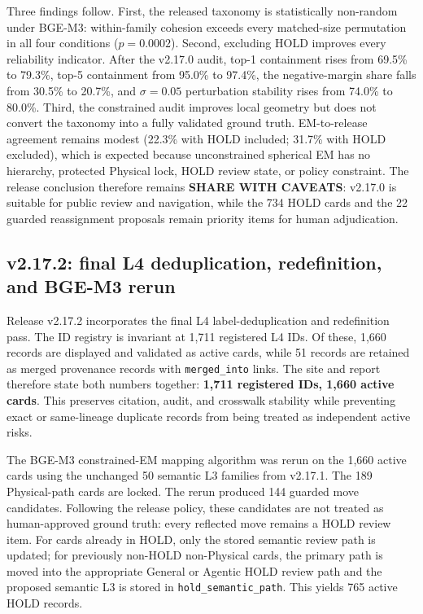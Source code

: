 \documentclass[11pt,a4paper]{article}
\newcommand{\code}[1]{\texttt{#1}}
\begin{document}
Three findings follow. First, the released taxonomy is statistically
non-random under BGE-M3: within-family cohesion exceeds every matched-size
permutation in all four conditions ($p=0.0002$). Second, excluding HOLD
improves every reliability indicator. After the v2.17.0 audit, top-1
containment rises from 69.5\% to 79.3\%, top-5 containment from 95.0\% to
97.4\%, the negative-margin share falls from 30.5\% to 20.7\%, and
$\sigma=0.05$ perturbation stability rises from 74.0\% to 80.0\%. Third, the
constrained audit improves local geometry but does not convert the taxonomy
into a fully validated ground truth. EM-to-release agreement remains modest
(22.3\% with HOLD included; 31.7\% with HOLD excluded), which is expected
because unconstrained spherical EM has no hierarchy, protected Physical lock,
HOLD review state, or policy constraint. The release conclusion therefore
remains \textbf{SHARE WITH CAVEATS}: v2.17.0 is suitable for public review and
navigation, while the 734 HOLD cards and the 22 guarded reassignment proposals
remain priority items for human adjudication.

\subsection{v2.17.2: final L4 deduplication, redefinition, and BGE-M3 rerun}

Release v2.17.2 incorporates the final L4 label-deduplication and
redefinition pass. The ID registry is invariant at 1,711 registered L4 IDs.
Of these, 1,660 records are displayed and validated as active cards, while 51
records are retained as merged provenance records with \code{merged\_into}
links. The site and report therefore state both numbers together:
\textbf{1,711 registered IDs, 1,660 active cards}. This preserves citation,
audit, and crosswalk stability while preventing exact or same-lineage duplicate
records from being treated as independent active risks.

The BGE-M3 constrained-EM mapping algorithm was rerun on the 1,660 active
cards using the unchanged 50 semantic L3 families from v2.17.1. The 189
Physical-path cards are locked. The rerun produced 144 guarded move
candidates. Following the release policy, these candidates are not treated as
human-approved ground truth: every reflected move remains a HOLD review item.
For cards already in HOLD, only the stored semantic review path is updated; for
previously non-HOLD non-Physical cards, the primary path is moved into the
appropriate General or Agentic HOLD review path and the proposed semantic L3 is
stored in \code{hold\_semantic\_path}. This yields 765 active HOLD records.
\end{document}
